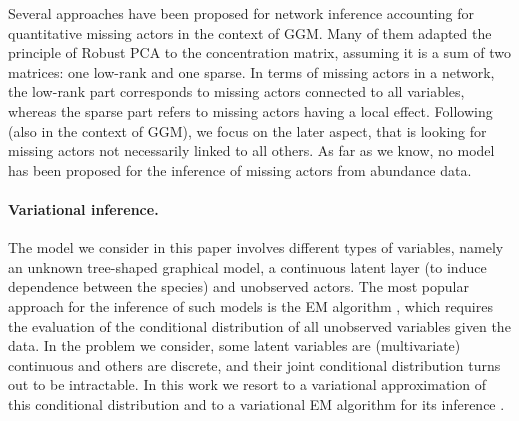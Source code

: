Several approaches have been proposed for network inference accounting for quantitative missing actors in the context of GGM. 
Many of them \citep{RankSparse,LLVGGM,GirLatent,EMlvggm} adapted the principle of Robust PCA \citep{candes2011robust} to the concentration matrix, assuming it is a sum of two matrices: one low-rank and one sparse. 
In terms of missing actors in a network, the low-rank part corresponds to missing actors connected to all variables, whereas the sparse part refers to missing actors having a local effect.
Following \cite{RAR19} (also in the context of GGM), we focus on the later aspect, that is looking for missing actors not necessarily linked to all others.
As far as we know, no model has been proposed for the inference of missing actors from abundance data.

\paragraph{Variational inference.}
The model we consider in this paper involves different types of variables, namely an unknown tree-shaped graphical model, a continuous latent layer (to induce dependence between the species) and unobserved actors. The most popular approach for the inference of such models is the EM algorithm \citep{DLR77}, which requires the evaluation of the conditional distribution of all unobserved variables given the data. In the problem we consider, some latent variables are (multivariate) continuous and others are discrete, and their joint conditional distribution turns out to be intractable. In this work we resort to a variational approximation \citep{WaJ08} of this conditional distribution and to a  variational EM  algorithm for its inference \citep[see e.g.][]{BKM17}.

